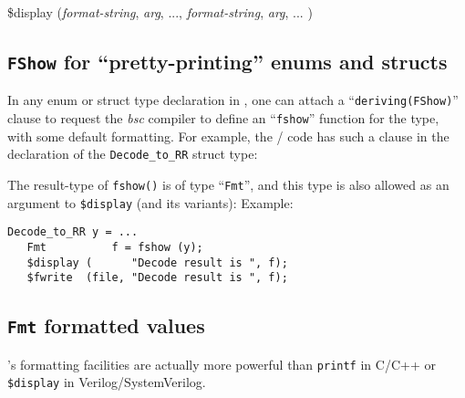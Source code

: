 \hmmmm
\$display  ({\it format-string}, {\it arg}, ..., {\it format-string}, {\it arg}, ... )


\subsection{{\tt FShow} for ``pretty-printing'' enums and structs}

\label{sec_FShow}


In any enum or struct type declaration in {\BSV}, one can attach a
``\verb|deriving(FShow)|'' clause to request the \emph{bsc} compiler
to define an ``\verb|fshow|'' function for the type, with some default
formatting.  For example, the {\DRUM}/{\FIFE} code has such a clause
in the declaration of the \verb|Decode_to_RR| struct type:


The result-type of \verb|fshow()| is of type ``\verb|Fmt|'', and this
type is also allowed as an argument to \verb|$display| (and its
variants):  Example:

{\footnotesize
\begin{Verbatim}[frame=single]
   Decode_to_RR y = ...
   Fmt          f = fshow (y);
   $display (      "Decode result is ", f);
   $fwrite  (file, "Decode result is ", f);
\end{Verbatim}
}




\subsection{{\tt Fmt} formatted values}

\label{Sec_Fmt_formatted_values}


{\BSV}'s formatting facilities are actually more powerful than
\verb|printf| in C/C++ or \verb|$display| in Verilog/SystemVerilog.

